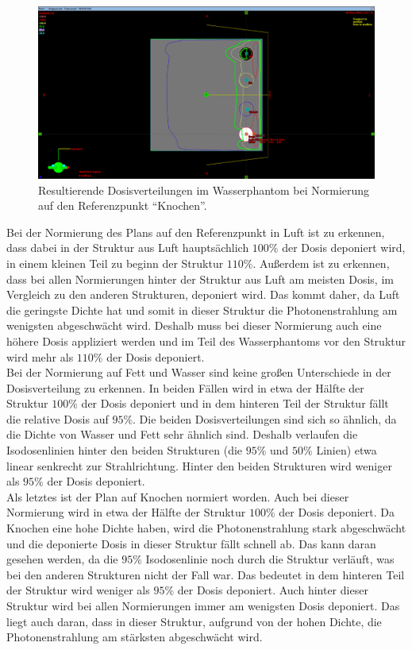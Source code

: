 \begin{figure}[H]
  \centering
  \includegraphics[width=\textwidth]{../../Wasserphantom Bilder/Aufgabe3.1_ReferenzKnochen.png}
  \caption{Resultierende Dosisverteilungen im Wasserphantom bei Normierung auf den Referenzpunkt \enquote{Knochen}.}
  \label{abb:3.1Knochen}
\end{figure}

Bei der Normierung des Plans auf den Referenzpunkt in Luft ist zu erkennen,
dass dabei in der Struktur aus Luft hauptsächlich $100\%$ der Dosis deponiert
wird, in einem kleinen Teil zu beginn der Struktur $110\%$. Außerdem
ist zu erkennen, dass bei allen Normierungen hinter der Struktur aus Luft
am meisten Dosis, im Vergleich zu den anderen Strukturen, deponiert wird.
Das kommt daher, da Luft die geringste Dichte hat und somit in dieser
Struktur die Photonenstrahlung am wenigsten abgeschwächt wird.
Deshalb muss bei dieser Normierung auch eine höhere Dosis appliziert werden
und im Teil des Wasserphantoms vor den Struktur wird mehr als $110\%$ der
Dosis deponiert.\\

Bei der Normierung auf Fett und Wasser sind keine großen Unterschiede
in der Dosisverteilung zu erkennen. In beiden Fällen wird in etwa der
Hälfte der Struktur $100\%$ der Dosis deponiert und in dem hinteren Teil
der Struktur fällt die relative Dosis auf $95\%$. Die beiden Dosisverteilungen
sind sich so ähnlich, da die Dichte von Wasser und Fett sehr ähnlich sind.
Deshalb verlaufen die Isodosenlinien hinter den beiden Strukturen
(die $95\%$ und $50\%$ Linien) etwa linear senkrecht zur Strahlrichtung.
Hinter den beiden Strukturen wird weniger als $95\%$ der Dosis deponiert. \\

Als letztes ist der Plan auf Knochen normiert worden. Auch bei dieser
Normierung wird in etwa der Hälfte der Struktur $100\%$ der Dosis deponiert.
Da Knochen eine hohe Dichte haben, wird die Photonenstrahlung stark
abgeschwächt und die deponierte Dosis in dieser Struktur fällt schnell ab.
Das kann daran gesehen werden, da die $95\%$ Isodosenlinie noch durch die
Struktur verläuft, was bei den anderen Strukturen nicht der Fall war. Das
bedeutet in dem hinteren Teil der Struktur wird weniger als $95\%$
der Dosis deponiert. Auch hinter dieser Struktur wird bei allen Normierungen
immer am wenigsten Dosis deponiert. Das liegt auch daran, dass in dieser
Struktur, aufgrund von der hohen Dichte, die Photonenstrahlung am stärksten
abgeschwächt wird.\\

